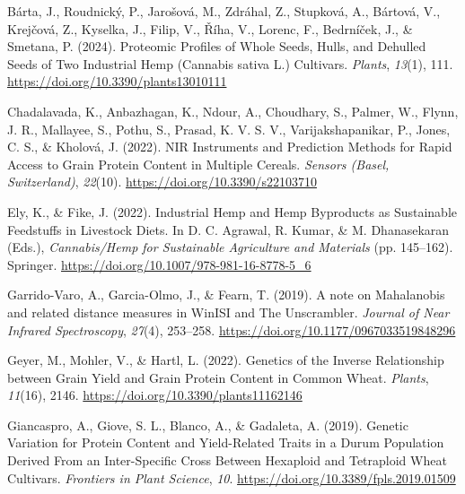 \documentclass[
]{agujournal2019}
\newlength{\cslhangindent}
\newenvironment{CSLReferences}[2] %
 {\begin{list}{}{%
  \setlength{\itemindent}{0pt}
  \setlength{\leftmargin}{0pt}
  \setlength{\parsep}{0pt}
  \ifodd #1
   \setlength{\leftmargin}{\cslhangindent}
   \setlength{\itemindent}{-1\cslhangindent}
  \fi
  \setlength{\itemsep}{#2\baselineskip}}}
 {\end{list}}
\begin{document}
\label{refs}
\begin{CSLReferences}{1}{0}
\vspace{1em}

Bárta, J., Roudnický, P., Jarošová, M., Zdráhal, Z., Stupková, A.,
Bártová, V., Krejčová, Z., Kyselka, J., Filip, V., Říha, V., Lorenc, F.,
Bedrníček, J., \& Smetana, P. (2024). Proteomic {Profiles} of {Whole}
{Seeds}, {Hulls}, and {Dehulled} {Seeds} of {Two} {Industrial} {Hemp}
({Cannabis} sativa {L}.) {Cultivars}. \emph{Plants}, \emph{13}(1), 111.
\url{https://doi.org/10.3390/plants13010111}

Chadalavada, K., Anbazhagan, K., Ndour, A., Choudhary, S., Palmer, W.,
Flynn, J. R., Mallayee, S., Pothu, S., Prasad, K. V. S. V.,
Varijakshapanikar, P., Jones, C. S., \& Kholová, J. (2022). {NIR}
{Instruments} and {Prediction} {Methods} for {Rapid} {Access} to {Grain}
{Protein} {Content} in {Multiple} {Cereals}. \emph{Sensors (Basel,
Switzerland)}, \emph{22}(10). \url{https://doi.org/10.3390/s22103710}

Ely, K., \& Fike, J. (2022). Industrial {Hemp} and {Hemp} {Byproducts}
as {Sustainable} {Feedstuffs} in {Livestock} {Diets}. In D. C. Agrawal,
R. Kumar, \& M. Dhanasekaran (Eds.), \emph{Cannabis/{Hemp} for
{Sustainable} {Agriculture} and {Materials}} (pp. 145--162). Springer.
\url{https://doi.org/10.1007/978-981-16-8778-5_6}

Garrido-Varo, A., Garcia-Olmo, J., \& Fearn, T. (2019). A note on
{Mahalanobis} and related distance measures in {WinISI} and {The}
{Unscrambler}. \emph{Journal of Near Infrared Spectroscopy},
\emph{27}(4), 253--258. \url{https://doi.org/10.1177/0967033519848296}

Geyer, M., Mohler, V., \& Hartl, L. (2022). Genetics of the {Inverse}
{Relationship} between {Grain} {Yield} and {Grain} {Protein} {Content}
in {Common} {Wheat}. \emph{Plants}, \emph{11}(16), 2146.
\url{https://doi.org/10.3390/plants11162146}

Giancaspro, A., Giove, S. L., Blanco, A., \& Gadaleta, A. (2019).
Genetic {Variation} for {Protein} {Content} and {Yield}-{Related}
{Traits} in a {Durum} {Population} {Derived} {From} an
{Inter}-{Specific} {Cross} {Between} {Hexaploid} and {Tetraploid}
{Wheat} {Cultivars}. \emph{Frontiers in Plant Science}, \emph{10}.
\url{https://doi.org/10.3389/fpls.2019.01509}


\end{CSLReferences}
\end{document}
